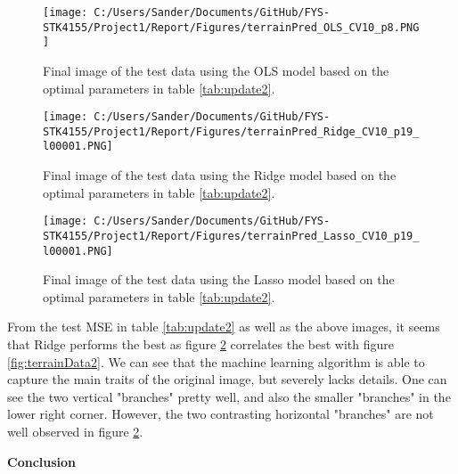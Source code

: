 \documentclass[12pt,a4paper]{article}
\begin{document}
\begin{figure}[H]
\centering
\texttt{[image: C:/Users/Sander/Documents/GitHub/FYS-STK4155/Project1/Report/Figures/terrainPred\_OLS\_CV10\_p8.PNG]}
\caption{\label{fig:predOLST} Final image of the test data using the OLS model based on the optimal parameters in table \ref{tab:update2}.}
\end{figure}

\begin{figure}[H]
\centering
\texttt{[image: C:/Users/Sander/Documents/GitHub/FYS-STK4155/Project1/Report/Figures/terrainPred\_Ridge\_CV10\_p19\_l00001.PNG]}
\caption{\label{fig:predRIDGET} Final image of the test data using the Ridge model based on the optimal parameters in table \ref{tab:update2}.}
\end{figure}

\begin{figure}[H]
\centering
\texttt{[image: C:/Users/Sander/Documents/GitHub/FYS-STK4155/Project1/Report/Figures/terrainPred\_Lasso\_CV10\_p19\_l00001.PNG]}
\caption{\label{fig:predLASSOT} Final image of the test data using the Lasso model based on the optimal parameters in table \ref{tab:update2}.}
\end{figure}

\noindent From the test MSE in table \ref{tab:update2} as well as the above images, it seems that Ridge performs the best as figure \ref{fig:predRIDGET} correlates the best with figure \ref{fig:terrainData2}. We can see that the machine learning algorithm is able to capture the main traits of the original image, but severely lacks details. One can see the two vertical "branches" pretty well, and also the smaller "branches" in the lower right corner. However, the two contrasting horizontal "branches" are not well observed in figure \ref{fig:predRIDGET}. 

\newpage

\begin{center}
\Large{\textbf{Conclusion}}
\end{center}
\end{document}
